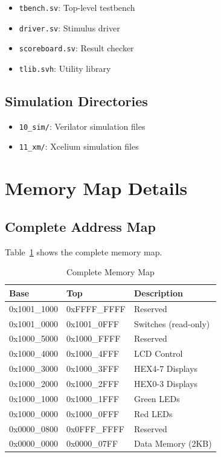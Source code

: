\begin{itemize}
    \item \texttt{tbench.sv}: Top-level testbench
    \item \texttt{driver.sv}: Stimulus driver
    \item \texttt{scoreboard.sv}: Result checker
    \item \texttt{tlib.svh}: Utility library
\end{itemize}

\subsection{Simulation Directories}

\begin{itemize}
    \item \texttt{10\_sim/}: Verilator simulation files
    \item \texttt{11\_xm/}: Xcelium simulation files
\end{itemize}

\section{Memory Map Details}

\subsection{Complete Address Map}

Table~\ref{tab:complete_memory_map} shows the complete memory map.

\begin{table}[ht]
\centering
\caption{Complete Memory Map}
\label{tab:complete_memory_map}
\begin{tabular}{lll}
\toprule
\textbf{Base} & \textbf{Top} & \textbf{Description} \\
\midrule
0x1001\_1000 & 0xFFFF\_FFFF & Reserved \\
0x1001\_0000 & 0x1001\_0FFF & Switches (read-only) \\
0x1000\_5000 & 0x1000\_FFFF & Reserved \\
0x1000\_4000 & 0x1000\_4FFF & LCD Control \\
0x1000\_3000 & 0x1000\_3FFF & HEX4-7 Displays \\
0x1000\_2000 & 0x1000\_2FFF & HEX0-3 Displays \\
0x1000\_1000 & 0x1000\_1FFF & Green LEDs \\
0x1000\_0000 & 0x1000\_0FFF & Red LEDs \\
0x0000\_0800 & 0x0FFF\_FFFF & Reserved \\
0x0000\_0000 & 0x0000\_07FF & Data Memory (2KB) \\
\bottomrule
\end{tabular}
\end{table}

